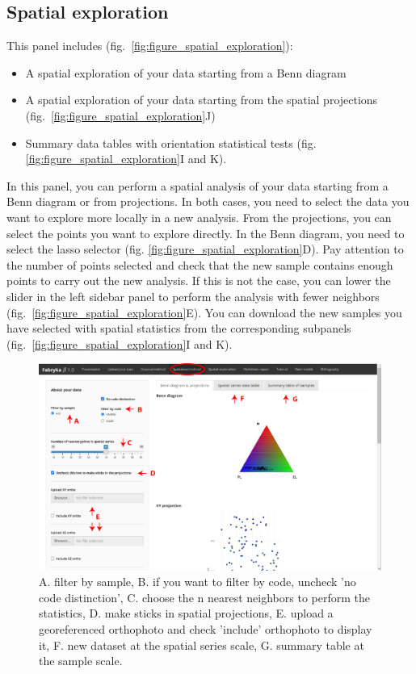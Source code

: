 \documentclass[
]{article}
\providecommand{\tightlist}{%
  \setlength{\itemsep}{0pt}\setlength{\parskip}{0pt}}
\begin{document}
\subsection{Spatial exploration}\label{spatial-exploration}

This panel includes (fig.~\ref{fig:figure_spatial_exploration}):

\begin{itemize}
\tightlist
\item
  A spatial exploration of your data starting from a Benn diagram
\item
  A spatial exploration of your data starting from the spatial
  projections (fig.~\ref{fig:figure_spatial_exploration}J)
\item
  Summary data tables with orientation statistical tests (fig.
  \ref{fig:figure_spatial_exploration}I and K).
\end{itemize}

In this panel, you can perform a spatial analysis of your data starting
from a Benn diagram or from projections. In both cases, you need to
select the data you want to explore more locally in a new analysis. From
the projections, you can select the points you want to explore directly.
In the Benn diagram, you need to select the lasso selector (fig.
\ref{fig:figure_spatial_exploration}D). Pay attention to the number of
points selected and check that the new sample contains enough points to
carry out the new analysis. If this is not the case, you can lower the
slider in the left sidebar panel to perform the analysis with fewer
neighbors (fig.~\ref{fig:figure_spatial_exploration}E). You can download
the new samples you have selected with spatial statistics from the
corresponding subpanels (fig.~\ref{fig:figure_spatial_exploration}I and
K). \bigbreak

\begin{figure} [h]
\centering
  \includegraphics[width=16cm]{figure/spatialised_method.jpg}
  \caption{A. filter by sample, B. if you want to filter by code, uncheck 'no code distinction', C. choose the n nearest neighbors to perform the statistics, D. make sticks in spatial projections, E. upload a georeferenced orthophoto and check 'include' orthophoto to display it, F. new dataset at the spatial series scale, G. summary table at the sample scale.}
\label{fig:figure_spatialised_method}
\end{figure}
\end{document}
